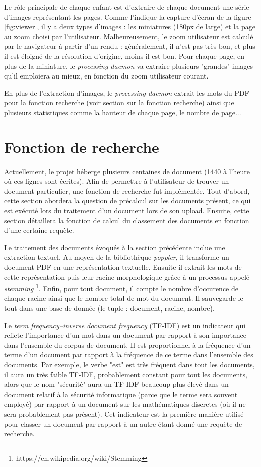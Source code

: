\documentclass[a4paper,12pt]{article}
\begin{document}
Le rôle principale de chaque enfant est d'extraire de chaque document une série
d'images représentant les pages. Comme l'indique la capture d'écran de la figure \ref{fig:viewer},
il y a deux types d'images : les miniatures (180px de large) et la page au zoom 
choisi par l'utilisateur. Malheureusement, le zoom utilisateur est calculé par
le navigateur à partir d'un rendu : généralement, il n'est pas très bon, et plus il
est éloigné de la résolution d'origine, moins il est bon. Pour chaque page, en
plus de la miniature, le \textit{processing-daemon} va extraire plusieurs "grandes"
images qu'il emploiera au mieux, en fonction du zoom utilisateur courant.

En plus de l'extraction d'images, le \textit{processing-daemon} extrait les mots
du PDF pour la fonction recherche (voir section sur la fonction recherche) ainsi que
plusieurs statistiques comme la hauteur de chaque page, le nombre de page...


\section{Fonction de recherche}

Actuellement, le projet héberge plusieurs centaines de document (1440 à l'heure où ces lignes sont écrites).
Afin de permettre à l'utilisateur de trouver un document particulier, une
fonction de recherche fut implémentée. Tout d'abord, cette section abordera
la question de précalcul sur les documents présent, ce qui est exécuté lors
du traitement d'un document lors de son upload. Ensuite, cette section
détaillera la fonction de calcul du classement des documents en fonction
d'une certaine requète.

Le traitement des documents évoqués à la section précédente inclue une extraction
textuel. Au moyen de la bibliothèque \textit{poppler}, il transforme un document
PDF en une représentation textuelle. Ensuite il extrait les mots de cette représentation
puis leur racine morphologique grâce à un processus appelé \textit{stemming}
\footnote{https://en.wikipedia.org/wiki/Stemming}. Enfin, pour tout document,
il compte le nombre d'occurence de chaque racine ainsi que le nombre total de mot du document.
Il sauvegarde le tout dans une base de donnée (le tuple : document, racine, nombre).

Le \textit{term frequency–inverse document frequency} (TF-IDF) est un indicateur
qui reflete l'importance d'un mot dans un document par rapport à son importance
dans l'ensemble du corpus de document. Il est proportionnel à la fréquence d'un terme
d'un document par rapport à la fréquence de ce terme dans l'ensemble des documents.
Par exemple, le verbe "est" est très fréquent dans tout les documents, il aura
un très faible TF-IDF, probablement constant pour tout les documents,
alors que le nom "sécurité" aura un TF-IDF beaucoup plus élevé dans un document
relatif à la sécurité informatique (parce que le terme sera souvent employé)
par rapport à un document sur les mathématiques discretes (où il ne sera probablement
pas présent). Cet indicateur est la première manière utilisé pour classer
un document par rapport à un autre étant donné une requète de recherche.
\end{document}
